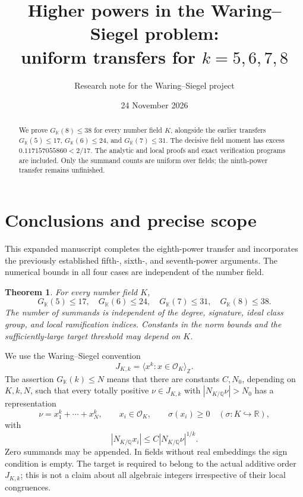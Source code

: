 \documentclass[11pt,reqno]{amsart}
\title[Uniform transfers for fifth through eighth powers]
{Higher powers in the Waring--Siegel problem:\\
uniform transfers for $k=5,6,7,8$}
\author{Research note for the Waring--Siegel project}
\date{24 November 2026}
\numberwithin{equation}{section}
\newtheorem{theorem}{Theorem}[section]
\theoremstyle{definition}
\begin{document}
\begin{abstract}
We prove $G_{\mathbb K}(8)\le38$ for every number field $K$, alongside the earlier
transfers $G_{\mathbb K}(5)\le17$, $G_{\mathbb K}(6)\le24$, and $G_{\mathbb K}(7)\le31$.
The decisive field moment has excess $0.117157055860<2/17$.
The analytic and local proofs and exact verification programs are included.
Only the summand counts are uniform over fields; the ninth-power transfer
remains unfinished.
\end{abstract}
\maketitle
\raggedbottom
{\small\tableofcontents}
\clearpage
\section{Conclusions and precise scope}
\label{sec:conclusions}

This expanded manuscript completes the eighth-power transfer and incorporates
the previously established fifth-, sixth-, and seventh-power arguments.
The numerical bounds in all four cases are independent of the number field.

\begin{theorem}\label{thm:main-transfer}
For every number field $K$,
\[
 \boxed{G_{\mathbb K}(5)\le17,\quad G_{\mathbb K}(6)\le24,\quad G_{\mathbb K}(7)\le31,\quad G_{\mathbb K}(8)\le38.}
\]
The number of summands is independent of the degree, signature, ideal class
group, and local ramification indices.  Constants in the norm bounds and
the sufficiently-large target threshold may depend on $K$.
\end{theorem}

We use the Waring--Siegel convention
\[
 J_{K,k}=\langle x^k:x\in\mathcal O_K\rangle_{\mathbb Z}.
\]
The assertion $G_{\mathbb K}(k)\le N$ means that there are constants $C,N_0$, depending
on $K,k,N$, such that every totally positive $\nu\in J_{K,k}$ with
$|N_{K/\mathbb Q}\nu|>N_0$ has a representation
\[
 \nu=x_1^k+\cdots+x_N^k,\qquad x_i\in\mathcal O_K,
 \qquad \sigma(x_i)\ge0\quad(\sigma:K\hookrightarrow\mathbb R),
\]
with
\[
 |N_{K/\mathbb Q}x_i|\le C|N_{K/\mathbb Q}\nu|^{1/k}.
\]
Zero summands may be appended.  In fields without real embeddings the sign
condition is empty.  The target is required to belong to the actual additive
order $J_{K,k}$; this is not a claim about all algebraic integers irrespective
of their local congruences.
\end{document}
